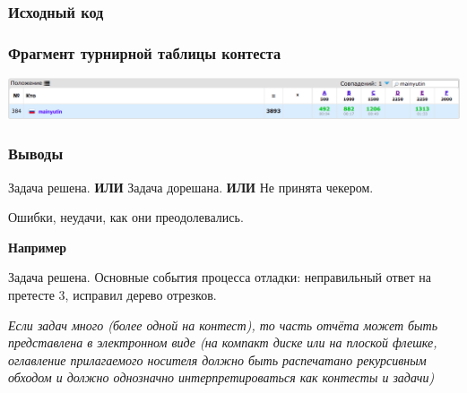 \subsubsection*{Исходный код}


\subsubsection*{Фрагмент турнирной таблицы контеста}
\begin{center}
\includegraphics[width=\textwidth]{standings/sample-cf.png}\newline\noindent
\end{center}

\subsubsection*{Выводы}
Задача решена. \textbf{ИЛИ} Задача дорешана. \textbf{ИЛИ} Не принята чекером.

Ошибки, неудачи, как они преодолевались.

{\bfseries \large Например}

Задача решена. Основные события процесса отладки: неправильный ответ на претесте 3, исправил дерево отрезков.

\vspace{20pt}
\textit{Если задач много (более одной на контест), то часть отчёта может быть представлена в электронном виде (на компакт диске или на плоской флешке, оглавление прилагаемого носителя должно быть распечатано рекурсивным обходом и должно однозначно интерпретироваться как контесты и задачи)}

\pagebreak
